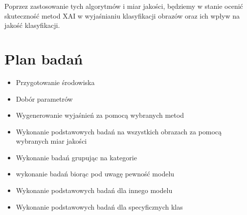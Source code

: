Poprzez zastosowanie tych algorytmów i miar jakości, będziemy w stanie ocenić skuteczność metod XAI w wyjaśnianiu klasyfikacji obrazów oraz ich wpływ na jakość klasyfikacji.

\section*{Plan badań}

\begin{itemize}
  \item Przygotowanie środowiska
  \item Dobór parametrów
  \item Wygenerowanie wyjaśnień za pomocą wybranych metod
  \item Wykonanie podstawowych badań na wszystkich obrazach za pomocą wybranych miar jakości
  \item Wykonanie badań grupując na kategorie
  \item wykonanie badań biorąc pod uwagę pewność modelu
  \item Wykonanie podstawowych badań dla innego modelu
  \item Wykonanie podstawowych badań dla specyficznych klas 
\end{itemize}
